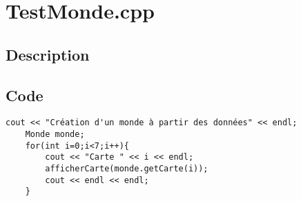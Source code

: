 \section{TestMonde.cpp}
        \subsection{Description}
            








        \subsection{Code}
\begin{lstlisting}
cout << "Création d'un monde à partir des données" << endl;
	Monde monde;
	for(int i=0;i<7;i++){
		cout << "Carte " << i << endl;
		afficherCarte(monde.getCarte(i));
		cout << endl << endl;
	}
	\end{lstlisting}

